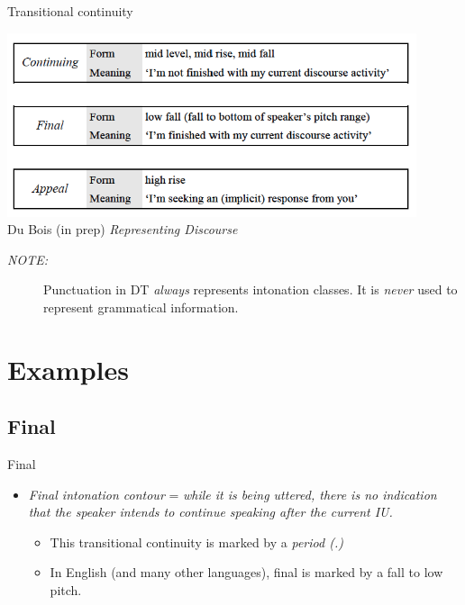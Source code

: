 \documentclass[compress,12pt]{beamer}%
\begin{document}
  \begin{frame}{Transitional continuity}
    \begin{center}
      \includegraphics[width=0.9\textwidth]{images/IU_Continuities.png}
      \\
      \hfill {\color{bluish}\tiny Du Bois (in prep) \textit{Representing Discourse}}
    \end{center}
  \end{frame}
  \begin{frame}
    \begin{description}
      \item[\emph{NOTE:}] Punctuation in DT \textit{always} represents intonation classes. It is \textit{never} used to represent grammatical information. 
    \end{description}
  \end{frame}

\section{Examples}
\subsection{Final} 
  \begin{frame}{Final}
    \begin{itemize}
      \item[] \emph{Final intonation contour} = \textit{while it is being uttered, there is no indication that the speaker intends to continue speaking after the current IU.}
      \begin{itemize}
        \item This transitional continuity is marked by a \emph{period (.)}
        \item In English (and many other languages), final is marked by a fall to low pitch.
      \end{itemize}
    \end{itemize}  
  \end{frame}
  
\end{document}
